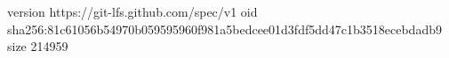 version https://git-lfs.github.com/spec/v1
oid sha256:81c61056b54970b059595960f981a5bedcee01d3fdf5dd47c1b3518ecebdadb9
size 214959
